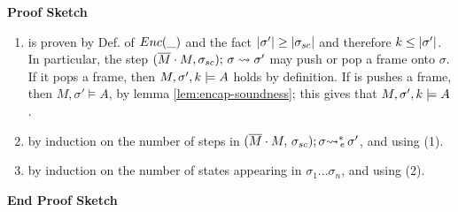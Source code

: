 \noindent
\textbf{Proof Sketch}

\begin{enumerate}
\item
 is proven by Def. of ${Enc( \_ )}$ and the fact $|\sigma'| \geq |\sigma_{sc}|$ and therefore $k\leq  |\sigma'|$.
In particular, the step $(\overline{M}\cdot M, \sigma_{sc});\, {\sigma} \rightsquigarrow \sigma'$ may push or pop a frame onto $\sigma$.
If it pops a frame, then $M,\sigma' ,{k} \models {A}  $ holds by definition.
If is pushes a frame, then $M, \sigma' \models A$, by lemma \ref{lem:encap-soundness}; this gives that $M,\sigma' ,{k} \models {A}  $.

\item   by induction on the number of steps in $ (\overline{M}\cdot M,\, {\sigma_{sc}}); \sigma{\rightsquigarrow^*}\!\!_{e}\, \sigma' $, and using (1).

\item
 by induction on the number of states   appearing in ${\sigma_1...\sigma_n}$, and using (2).
\end{enumerate}

\textbf{End Proof Sketch}





